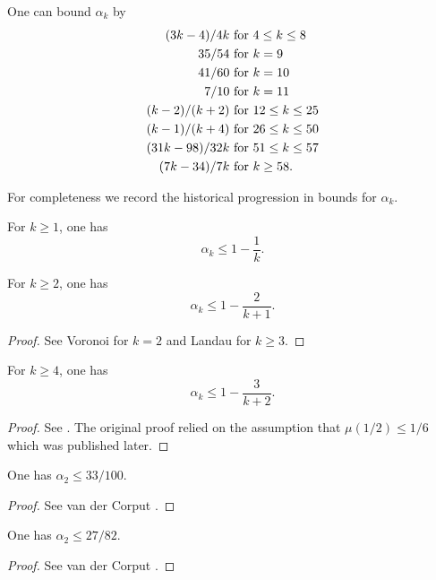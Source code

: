 \begin{theorem}\cite[Theorem 13.12]{ivic}  One can bound $\alpha_k$ by
    \begin{align*}
        (3k-4)/4k & \hbox{ for } 4 \leq k \leq 8 \\
        35/54 & \hbox{ for } k = 9 \\
        41/60 & \hbox{ for } k = 10 \\
        7/10 & \hbox{ for } k = 11 \\
        (k-2)/(k+2) & \hbox{ for } 12 \leq k \leq 25 \\
        (k-1)/(k+4) & \hbox{ for } 26 \leq k \leq 50 \\
        (31k-98)/32k & \hbox{ for } 51 \leq k \leq 57 \\
        (7k-34)/7k & \hbox{ for } k \geq 58.
    \end{align*}
\end{theorem}

For completeness we record the historical progression in bounds for $\alpha_k$.  
\begin{lemma}For $k \ge 1$, one has
\[
\alpha_k \le 1 - \frac{1}{k}.
\]
\end{lemma}
\begin{lemma}
For $k \ge 2$, one has
\[
\alpha_k \leq 1 - \frac{2}{k + 1}.
\]
\end{lemma}
\begin{proof}
See Voronoi \cite{voronoi_sur_1903} for $k = 2$ and Landau \cite{landau_uber_1912} for $k \ge 3$. 
\end{proof}

\begin{lemma}
For $k \ge 4$, one has
\[
\alpha_k \leq 1 - \frac{3}{k + 2}.
\]
\end{lemma}
\begin{proof}
See \cite{hardy_littlewood_approximate_1923}. The original proof relied on the assumption that $\mu(1/2) \le 1/6$ which was published later. 
\end{proof}

\begin{lemma}
One has $\alpha_2 \le 33/100$. 
\end{lemma}
\begin{proof}
See van der Corput \cite{van_der_corput_verscharfung_1922}.
\end{proof}


\begin{lemma}
One has $\alpha_2 \le 27/82$. 
\end{lemma}
\begin{proof}
See van der Corput \cite{van_der_corput_zum_1928}.
\end{proof}

